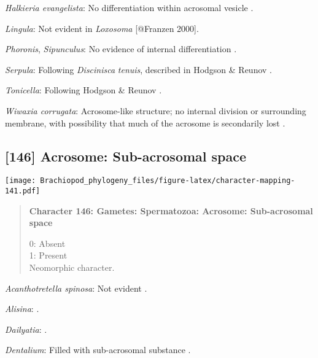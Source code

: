 \documentclass[openany]{book}
\theoremstyle{definition}
\theoremstyle{definition}
\theoremstyle{definition}
\theoremstyle{remark}
\begin{document}
\hypertarget{Halkieria_evangelista-coding-145}{}
\emph{Halkieria evangelista}: No differentiation within acrosomal
vesicle \citep{Rice1993}.

\hypertarget{Lingula-coding-145}{}
\emph{Lingula}: Not evident in \emph{Loxosoma} {[}@Franzen 2000{]}.

\hypertarget{Phoronis-coding-145}{}
\emph{Phoronis}, \emph{Sipunculus}: No evidence of internal
differentiation \citep[in \emph{Tubulipora};][]{Franzen1984}.

\hypertarget{Serpula-coding-145}{}
\emph{Serpula}: Following \emph{Discinisca} \emph{tenuis}, described in
Hodgson \& Reunov \citeyearpar{Hodgson1994Ultrastructureof}.

\hypertarget{Tonicella-coding-145}{}
\emph{Tonicella}: Following Hodgson \& Reunov
\citeyearpar{Hodgson1994Ultrastructureof}.

\hypertarget{Wiwaxia_corrugata-coding-145}{}
\emph{Wiwaxia corrugata}: Acrosome-like structure; no internal division
or surrounding membrane, with possibility that much of the acrosome is
secondarily lost \citep{Reunov2004Ultrastructuralstudy}.

\subsection*{{[}146{]} Acrosome: Sub-acrosomal
space}\label{acrosome-sub-acrosomal-space}

\texttt{[image: Brachiopod\_phylogeny\_files/figure-latex/character-mapping-141.pdf]}

\begin{quote}
\textbf{Character 146: Gametes: Spermatozoa: Acrosome: Sub-acrosomal
space}

0: Absent\\
1: Present\\
Neomorphic character.
\end{quote}

\hypertarget{Acanthotretella_spinosa-coding-146}{}
\emph{Acanthotretella spinosa}: Not evident \citep{BucklandNicks1988}.

\hypertarget{Alisina-coding-146}{}
\emph{Alisina}: \citet{DufresneDube1983}.

\hypertarget{Dailyatia-coding-146}{}
\emph{Dailyatia}: \citet{Gherardi2011}.

\hypertarget{Dentalium-coding-146}{}
\emph{Dentalium}: Filled with sub-acrosomal substance
\citep{Fukumoto2003Theacrosome}.
\end{document}
